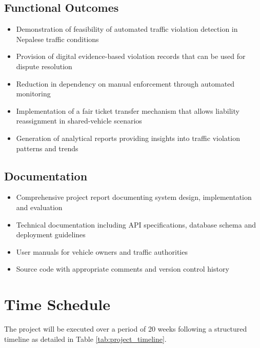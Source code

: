 \documentclass[12pt, a4paper, oneside]{memoir}
\begin{document}
\subsection{Functional Outcomes}
\begin{itemize}
    \item Demonstration of feasibility of automated traffic violation detection in Nepalese traffic conditions
    \item Provision of digital evidence-based violation records that can be used for dispute resolution
    \item Reduction in dependency on manual enforcement through automated monitoring
    \item Implementation of a fair ticket transfer mechanism that allows liability reassignment in shared-vehicle scenarios
    \item Generation of analytical reports providing insights into traffic violation patterns and trends
\end{itemize}

\subsection{Documentation}
\begin{itemize}
    \item Comprehensive project report documenting system design, implementation and evaluation
    \item Technical documentation including API specifications, database schema and deployment guidelines
    \item User manuals for vehicle owners and traffic authorities
    \item Source code with appropriate comments and version control history
\end{itemize}

\section{Time Schedule}

The project will be executed over a period of 20 weeks following a structured timeline as detailed in Table \ref{tab:project_timeline}.
\end{document}
